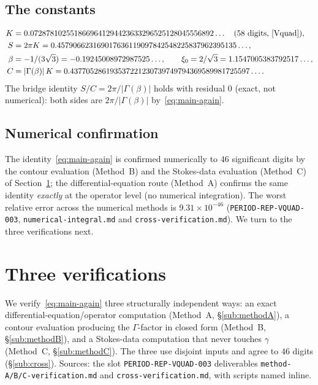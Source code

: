 \documentclass[11pt,reqno]{amsart}
\theoremstyle{plain}
\theoremstyle{definition}
\newcommand{\xizero}{\xi_0}
\providecommand{\C}{}\renewcommand{\C}{C}
\begin{document}
\subsection{The constants}
\begin{equation}\label{eq:constants}
\begin{aligned}
  K&=0.0728781025518669641294423633296525128045556892\ldots\quad(\text{58 digits, \cite{Vquad}}),\\
  S&=2\pi K=0.457906623169017636119097842548225837962395135\ldots,\\
  \beta&=-1/(3\sqrt3)=-0.19245008972987525\ldots,\qquad \xizero=2/\sqrt3=1.1547005383792517\ldots,\\
  \C&=\lvert\Gamma(\beta)\rvert\,K=0.437705286193537221230739749794369589981725597\ldots .
\end{aligned}
\end{equation}
The bridge identity $S/\C=2\pi/\lvert\Gamma(\beta)\rvert$ holds with residual $0$ (exact, not
numerical): both sides are $2\pi/\lvert\Gamma(\beta)\rvert$ by~\eqref{eq:main-again}.

\subsection{Numerical confirmation}
The identity~\eqref{eq:main-again} is confirmed numerically to $46$ significant digits by the
contour evaluation (Method~B) and the Stokes-data evaluation (Method~C) of
Section~\ref{sec:verif}; the differential-equation route (Method~A) confirms the same identity
\emph{exactly} at the operator level (no numerical integration). The worst relative error across
the numerical methods is $9.31\times10^{-46}$
(\texttt{PERIOD-REP-VQUAD-003}, \texttt{numerical-integral.md} and
\texttt{cross-verification.md}). We turn to the three verifications next.

\section{Three verifications}\label{sec:verif}

We verify~\eqref{eq:main-again} three structurally independent ways: an exact
differential-equation/operator computation (Method~A, \S\ref{sub:methodA}), a contour evaluation
producing the $\Gamma$-factor in closed form (Method~B, \S\ref{sub:methodB}), and a Stokes-data
computation that never touches $\gamma$ (Method~C, \S\ref{sub:methodC}). The three use disjoint
inputs and agree to $46$ digits (\S\ref{sub:cross}). Sources: the slot
\texttt{PERIOD-REP-VQUAD-003} deliverables \texttt{method-A/B/C-verification.md} and
\texttt{cross-verification.md}, with scripts named inline.
\end{document}
